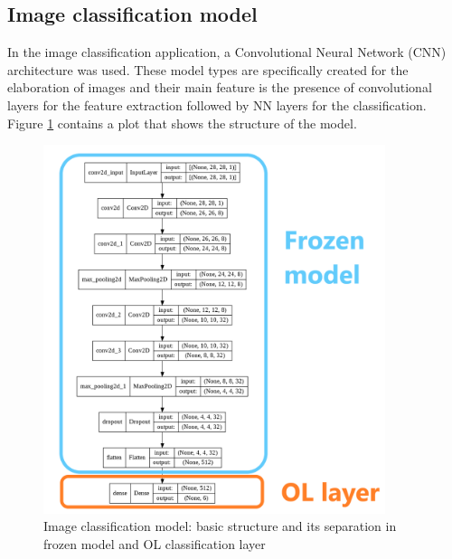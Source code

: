 \documentclass[12pt]{report}
\begin{document}
\subsection{Image classification model}
In the image classification application, a Convolutional Neural Network (CNN) architecture was used. These model types are specifically created for the elaboration of images and their main feature is the presence of convolutional layers for the feature extraction followed by NN layers for the classification. Figure \ref{fig:openmv_structure} contains a plot that shows the structure of the model.\\

\begin{figure}[h!]
    \centering
    \includegraphics[width=100mm]{Figures/Chapter4/openmv_structure.png} 
    \caption{Image classification model: basic structure and its separation in frozen model and OL classification layer}
    \label{fig:openmv_structure}    
\end{figure}
\end{document}
